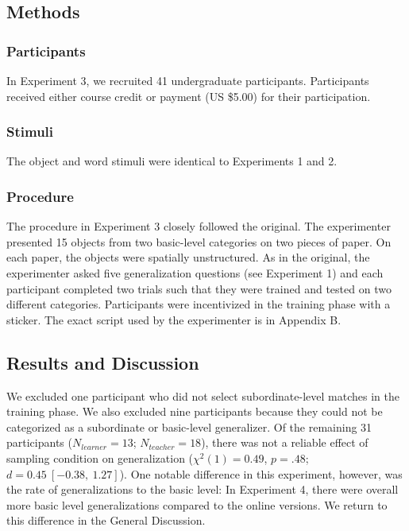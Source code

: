 \documentclass[man]{apa2}
\begin{document}
\subsection{Methods}

\subsubsection{Participants}  In Experiment 3, we recruited 41 undergraduate participants. Participants received either course credit or payment (US \$5.00) for their participation. 

\subsubsection{Stimuli}
The object and word stimuli were identical to Experiments 1 and 2. 

\subsubsection{Procedure}
The procedure in Experiment 3 closely followed the original. The experimenter presented 15 objects from two basic-level categories on two pieces of paper. On each paper, the objects were spatially unstructured. As in the original, the experimenter asked five generalization questions (see Experiment 1) and  each participant completed two trials such that they were trained and tested on two different categories.  Participants were incentivized in the training phase with a sticker. The exact script used by the experimenter is in Appendix B. 

\subsection{Results and Discussion}
We excluded one participant who did not select subordinate-level matches in the training phase.  We also excluded nine participants because they could not be categorized as a subordinate or basic-level generalizer. Of the remaining 31 participants ($N_{learner} = 13$; $N_{teacher} = 18$), there was not a reliable effect of sampling condition on generalization ($\chi^2(1) = 0.49$,  $p = .48$; $d = 0.45\ [-0.38,\ 1.27]$). One notable difference in this experiment, however, was the rate of generalizations to the basic level: In Experiment 4, there were overall more basic level generalizations compared to the online versions. We return to this difference in the General Discussion.
\end{document}
